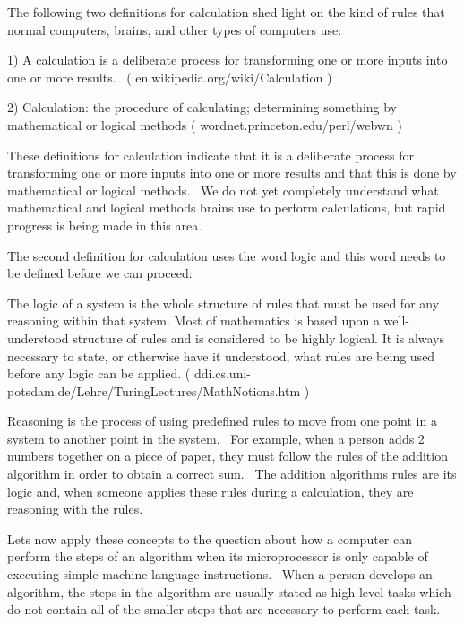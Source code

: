 \documentclass[12pt,twoside]{book}
\begin{document}
The following two definitions for calculation shed light on the kind of
rules that normal computers, brains, and other types of computers use:


\bigskip

1) A calculation is a deliberate process for transforming one or more
inputs into one or more results. \ ( en.wikipedia.org/wiki/Calculation
)


\bigskip

2) Calculation: the procedure of calculating; determining something by
mathematical or logical methods ( wordnet.princeton.edu/perl/webwn )


\bigskip

These definitions for calculation indicate that it {\textquotedbl}is a
deliberate process for transforming one or more inputs into one or more
results{\textquotedbl} and that this is done {\textquotedbl}by
mathematical or logical methods{\textquotedbl}. \ We do not yet
completely understand what mathematical and logical methods brains use
to perform calculations, but rapid progress is being made in this area.


\bigskip

The second definition for calculation uses the word logic and this word
needs to be defined before we can proceed:


\bigskip

The logic of a system is the whole structure of rules that must be used
for any reasoning within that system. Most of mathematics is based upon
a well{}-understood structure of rules and is considered to be highly
logical. It is always necessary to state, or otherwise have it
understood, what rules are being used before any logic can be applied.
( ddi.cs.uni{}-potsdam.de/Lehre/TuringLectures/MathNotions.htm )


\bigskip

Reasoning is the process of using predefined rules to move from one
point in a system to another point in the system. \ For example, when a
person adds 2 numbers together on a piece of paper, they must follow
the rules of the addition algorithm in order to obtain a correct sum.
\ The addition algorithm{\textquotesingle}s rules are its logic and,
when someone applies these rules during a calculation, they are
reasoning with the rules.


\bigskip

Lets now apply these concepts to the question about how a computer can
perform the steps of an algorithm when its microprocessor is only
capable of executing simple machine language instructions. \ When a
person develops an algorithm, the steps in the algorithm are usually
stated as high{}-level tasks which do not contain all of the smaller
steps that are necessary to perform each task.
\end{document}
